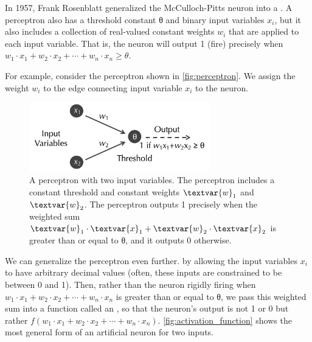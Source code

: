 In 1957, Frank Rosenblatt generalized the McCulloch-Pitts neuron into a . A perceptron also has a threshold constant θ and  binary input variables $x_i$, but it also includes a collection of real-valued constant weights $w_i$ that are applied to each input variable. That is, the neuron will output 1 (fire) precisely when $w_1 \cdot x_1 + w_2 \cdot x_2 + \cdots + w_n \cdot x_n \geq θ$.\\

\begin{note}\end{note}

For example, consider the perceptron shown in \autoref{fig:perceptron}. We assign the weight $w_i$ to the edge connecting input variable $x_i$ to the neuron.\\

\begin{figure}[h]
\centering
\mySfFamily
\includegraphics[width = 0.7\textwidth]{../images/perceptron.png}
\caption{A perceptron with two input variables. The perceptron includes a constant threshold and constant weights $\textvar{w}_\text{1}$ and $\textvar{w}_\text{2}$. The perceptron outputs 1 precisely when the weighted sum $\textvar{w}_\text{1} \cdot \textvar{x}_\text{1} + \textvar{w}_\text{2} \cdot \textvar{x}_\text{2}$ is greater than or equal to θ, and it outputs 0 otherwise.}
\label{fig:perceptron}
\end{figure}

We can generalize the perceptron even further. by allowing the input variables $x_i$ to have arbitrary decimal values (often, these inputs are constrained to be between 0 and 1). Then, rather than the neuron rigidly firing when $w_1 \cdot x_1 + w_2 \cdot x_2 + \cdots + w_n \cdot x_n$ is greater than or equal to θ, we pass this weighted sum into a function  called an , so that the neuron's output is not 1 or 0 but rather $f(w_1 \cdot x_1 + w_2 \cdot x_2 + \cdots + w_n \cdot x_n)$. \autoref{fig:activation_function} shows the most general form of an artificial neuron for two inputs.\\

